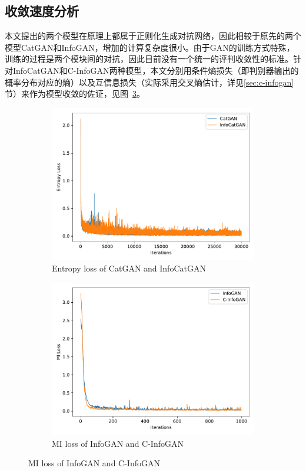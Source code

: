 \subsection{收敛速度分析}
本文提出的两个模型在原理上都属于正则化生成对抗网络，因此相较于原先的两个模型CatGAN和InfoGAN，增加的计算复杂度很小。由于GAN的训练方式特殊，训练的过程是两个模块间的对抗，因此目前没有一个统一的评判收敛性的标准。针对InfoCatGAN和C-InfoGAN两种模型，本文分别用条件熵损失（即判别器输出的概率分布对应的熵）以及互信息损失（实际采用交叉熵估计，详见\ref{sec:c-infogan}节）来作为模型收敛的佐证，见图~\ref{fig:convergence}。
\begin{figure}[htbp]
  \centering
  \begin{subfigure}[b]{\twof\textwidth}
    \includegraphics[width=\textwidth]{Img/icg-convergence.pdf}
    \caption{Entropy loss of CatGAN and InfoCatGAN}
    \label{ffig:icg-convergence}
  \end{subfigure}
  \begin{subfigure}[b]{\twof\textwidth}
    \includegraphics[width=\textwidth]{Img/cig-convergence.pdf}
    \caption{MI loss of InfoGAN and C-InfoGAN}
    \label{ffig:cig-convergence}
  \end{subfigure}
  \label{fig:convergence}
\end{figure}

